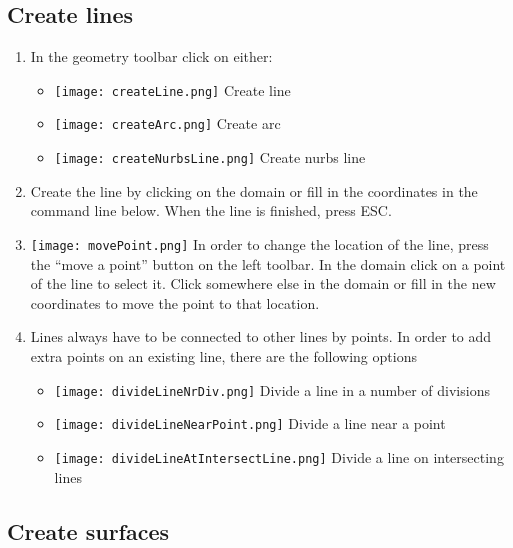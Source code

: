 \subsection{Create lines}
\begin{enumerate}
	\setlength\itemsep{2mm}
	
	\item In the geometry toolbar click on either:  
		\begin{itemize}
		\setlength\itemsep{2mm}
		\item \texttt{[image: createLine.png]}   Create line 
		
		\item \texttt{[image: createArc.png]}  Create arc 
		
		\item \texttt{[image: createNurbsLine.png]} Create nurbs line 
		\end{itemize}
	\item Create the line by clicking on the domain or fill in the coordinates in the command line below. When the line is finished, press ESC. 
	
	\item \texttt{[image: movePoint.png]} In order to change the location of the line, press the “move a point” button on the left toolbar.  In the domain click on a point of the line to select it. Click somewhere else in the domain or fill in the new coordinates to move the point to that location. 
	
	\item Lines always have to be connected to other lines by points. In order to add extra points on an existing line, there are the following options
	
	\begin{itemize}
	\setlength\itemsep{2mm}
		\item \texttt{[image: divideLineNrDiv.png]}   Divide a line in a number of divisions 
	
		\item \texttt{[image: divideLineNearPoint.png]}  Divide a line near a point
	
		\item \texttt{[image: divideLineAtIntersectLine.png]} Divide a line on intersecting lines  
	\end{itemize}

	\end{enumerate}

\subsection{Create surfaces}

